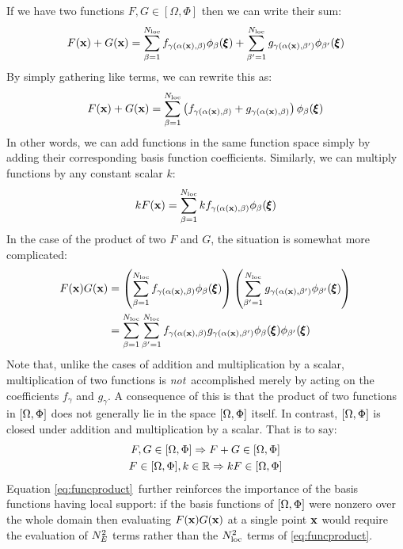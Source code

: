 \documentclass[a4paper, 11pt]{book}
\begin{document}
If we have two functions $F,G\in[\Omega, \Phi]$ then we can write their sum:
\begin{equation}
  F(\mathbf{x})+G(\mathbf{x})=\sum_{\beta=1}^{N_\mathrm{loc}}
  f_{\gamma(\alpha(\mathbf{x}),\beta)}\phi_{\beta}(\pmb{\xi}) 
  + \sum_{\beta'=1}^{N_\mathrm{loc}} g_{\gamma(\alpha(\mathbf{x}),\beta')}\phi_{\beta'}(\pmb{\xi})
\end{equation}
By simply gathering like terms, we can rewrite this as:
\begin{equation}
  F(\mathbf{x})+G(\mathbf{x})=\sum_{\beta=1}^{N_\mathrm{loc}}
  \left(f_{\gamma(\alpha(\mathbf{x}),\beta)}+g_{\gamma(\alpha(\mathbf{x}),\beta)}\right)\phi_{\beta}(\pmb{\xi})
\end{equation}
In other words, we can add functions in the same function space simply by
adding their corresponding basis function coefficients. Similarly, we can
multiply functions by any constant scalar $k$:
\begin{equation}
  kF(\mathbf{x})=\sum_{\beta=1}^{N_\mathrm{loc}}
  kf_{\gamma(\alpha(\mathbf{x}),\beta)}\phi_{\beta}(\pmb{\xi}) 
\end{equation}
In the case of the product of two $F$ and $G$, the situation is somewhat
more complicated:
\begin{equation}\label{eq:funcproduct}
  \begin{split}
    F(\mathbf{x})G(\mathbf{x})&=\left(\sum_{\beta=1}^{N_\mathrm{loc}}
      f_{\gamma(\alpha(\mathbf{x}),\beta)}\phi_{\beta}(\pmb{\xi})\right)
    \left(\sum_{\beta'=1}^{N_\mathrm{loc}}
      g_{\gamma(\alpha(\mathbf{x}),\beta')}\phi_{\beta'}(\pmb{\xi})\right)\\
    &=\sum_{\beta=1}^{N_\mathrm{loc}}\sum_{\beta'=1}^{N_\mathrm{loc}}
      f_{\gamma(\alpha(\mathbf{x}),\beta)}g_{\gamma(\alpha(\mathbf{x}),\beta')}
      \phi_{\beta}(\pmb{\xi})\phi_{\beta'}(\pmb{\xi})
  \end{split}
\end{equation}
Note that, unlike the cases of addition and multiplication by a scalar,
multiplication of two functions is \emph{not}\ accomplished merely by acting
on the coefficients $f_\gamma$ and $g_\gamma$. A consequence of this is that
the product of two functions in $[\Omega,\Phi]$ does not generally lie in
the space $[\Omega,\Phi]$ itself. In contrast, $[\Omega,\Phi]$ is closed
under addition and multiplication by a scalar. That is to say:
\begin{gather}
  F,G\in[\Omega,\Phi] \Rightarrow F+G\in[\Omega,\Phi]\\
  F\in[\Omega,\Phi], k\in\mathbb{R} \Rightarrow kF\in[\Omega,\Phi]
\end{gather}
Equation \eqref{eq:funcproduct}\ further reinforces the importance of the
basis functions having local support: if the basis functions of $[\Omega,\Phi]$
were nonzero over the whole domain then evaluating $F(\mathbf{x})G(\mathbf{x})$ at a single
point $\mathbf{x}$ would require the evaluation of $N_E^2$ terms rather than the
$N_\mathrm{loc}^2$ terms of \eqref{eq:funcproduct}.
\end{document}
